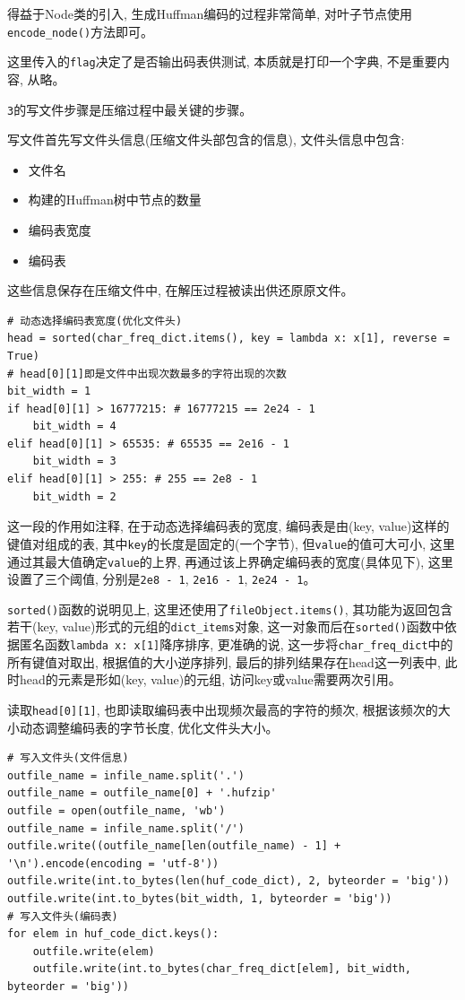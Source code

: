 \documentclass{ctexart}
\begin{document}
得益于Node类的引入, 生成Huffman编码的过程非常简单, 对叶子节点使用\texttt{encode\_node()}方法即可。

这里传入的\texttt{flag}决定了是否输出码表供测试, 本质就是打印一个字典, 不是重要内容, 从略。

\texttt{3}的写文件步骤是压缩过程中最关键的步骤。

写文件首先写文件头信息(压缩文件头部包含的信息), 文件头信息中包含:

\begin{itemize}
\item
  文件名
\item
  构建的Huffman树中节点的数量
\item
  编码表宽度
\item
  编码表
\end{itemize}

这些信息保存在压缩文件中, 在解压过程被读出供还原原文件。

{\setmainfont{Courier New Bold}              
\begin{lstlisting}
# 动态选择编码表宽度(优化文件头)
head = sorted(char_freq_dict.items(), key = lambda x: x[1], reverse = True)
# head[0][1]即是文件中出现次数最多的字符出现的次数
bit_width = 1
if head[0][1] > 16777215: # 16777215 == 2e24 - 1
    bit_width = 4
elif head[0][1] > 65535: # 65535 == 2e16 - 1
    bit_width = 3
elif head[0][1] > 255: # 255 == 2e8 - 1
    bit_width = 2
\end{lstlisting}}

这一段的作用如注释, 在于动态选择编码表的宽度, 编码表是由(key, value)这样的键值对组成的表, 其中\texttt{key}的长度是固定的(一个字节), 但\texttt{value}的值可大可小, 这里通过其最大值确定\texttt{value}的上界, 再通过该上界确定编码表的宽度(具体见下), 这里设置了三个阈值, 分别是\texttt{2e8\ -\ 1}, \texttt{2e16\ -\ 1}, \texttt{2e24\ -\ 1}。

\texttt{sorted()}函数的说明见上, 这里还使用了\texttt{fileObject.items()}, 其功能为返回包含若干(key,
value)形式的元组的\texttt{dict\_items}对象, 这一对象而后在\texttt{sorted()}函数中依据匿名函数\texttt{lambda\ x:\ x{[}1{]}}降序排序, 更准确的说, 这一步将\texttt{char\_freq\_dict}中的所有键值对取出,
根据值的大小逆序排列, 最后的排列结果存在head这一列表中, 此时head的元素是形如(key, value)的元组, 访问key或value需要两次引用。

读取\texttt{head{[}0{]}{[}1{]}}, 也即读取编码表中出现频次最高的字符的频次, 根据该频次的大小动态调整编码表的字节长度, 优化文件头大小。

{\setmainfont{Courier New Bold}              
\begin{lstlisting}
# 写入文件头(文件信息)
outfile_name = infile_name.split('.')
outfile_name = outfile_name[0] + '.hufzip'
outfile = open(outfile_name, 'wb')
outfile_name = infile_name.split('/')
outfile.write((outfile_name[len(outfile_name) - 1] + '\n').encode(encoding = 'utf-8'))
outfile.write(int.to_bytes(len(huf_code_dict), 2, byteorder = 'big'))
outfile.write(int.to_bytes(bit_width, 1, byteorder = 'big'))
# 写入文件头(编码表)
for elem in huf_code_dict.keys():
    outfile.write(elem)
    outfile.write(int.to_bytes(char_freq_dict[elem], bit_width, byteorder = 'big'))
\end{lstlisting}}
\end{document}
